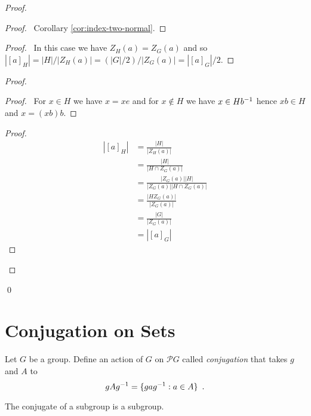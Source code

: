 \begin{proof}
\pf
{}
\begin{proof}
	\pf\ Corollary \ref{cor:index-two-normal}.
\end{proof}
\begin{proof}
	\pf\ In this case we have $Z_H(a) = Z_G(a)$ and so $|[a]_H| = |H| / |Z_H(a)| = (|G|/2)/|Z_G(a)| = |[a]_G|/2$.
\end{proof}
\begin{proof}
	\pf
	\begin{proof}
		\pf\ For $x \in H$ we have $x = xe$ and for $x \notin H$ we have $x \in H{b}^{-1}$ hence $xb \in H$ and $x = (xb)b$.
	\end{proof}
	\begin{proof}
	\pf
	\begin{align*}
		|[a]_H| & = \frac{|H|}{|Z_H(a)|} \\
		& = \frac{|H|}{|H \cap Z_G(a)|} \\
		& = \frac{|Z_G(a)||H|}{|Z_G(a)||H \cap Z_G(a)|} \\
		& = \frac{|HZ_G(a)|}{|Z_G(a)|} \\
		& = \frac{|G|}{|Z_G(a)|} \\
		& = |[a]_G|
	\end{align*}
	\end{proof}
\end{proof}
\qed
\end{proof}

\section{Conjugation on Sets}

\begin{df}[Conjugation]
Let $G$ be a group. Define an action of $G$ on $\mathcal{P} G$ called \emph{conjugation} that takes $g$ and $A$ to
\[ gA{g}^{-1} = \{ ga{g}^{-1} : a \in A \} \enspace . \]
\end{df}

\begin{prop}
The conjugate of a subgroup is a subgroup.
\end{prop}

